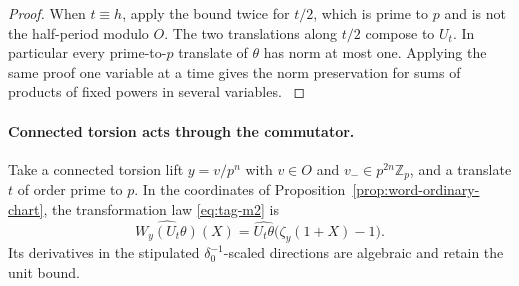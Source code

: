 \begin{proof}
When \(t\equiv h\), apply the bound
twice for \(t/2\), which is prime to \(p\) and is not the
half-period modulo \(O\). The two translations along
\(t/2\) compose to \(U_t\). In particular every prime-to-\(p\)
translate of \(\theta\) has norm at most one. Applying the
same proof one variable at a time gives the norm preservation
for sums of products of fixed powers in several variables.
\label{cor:word-measure-2}

\end{proof}

\paragraph{Connected torsion acts through the commutator.}
\begin{proposition}\label{prop:word-connected-torsion}
Take a connected torsion lift \(y=v/p^n\) with
\(v\in O\) and \(v_-\in p^{2n}\mathbb Z_p\), and a translate \(t\)
of order prime to \(p\). In the coordinates of Proposition~\ref{prop:word-ordinary-chart}, the transformation law \textup{\eqref{eq:tag-m2}} is
\[
 \widehat{W_y(U_t\theta)}(X)=\widehat{U_t\theta}\big(\zeta_y(1+X)-1\big).
\]
 Its derivatives
in the stipulated \(\delta_0^{-1}\)-scaled directions are
algebraic and retain the unit bound.
\end{proposition}


